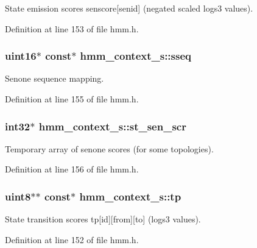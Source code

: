 State emission scores senscore[senid] (negated scaled logs3 values). 



Definition at line 153 of file hmm.\-h.

\subsubsection[{sseq}]{\setlength{\rightskip}{0pt plus 5cm}uint16$\ast$ const$\ast$ hmm\-\_\-context\-\_\-s\-::sseq}\label{structhmm__context__s_abbb0a32aadcc1938d9f21b04204c52da}


Senone sequence mapping. 



Definition at line 155 of file hmm.\-h.

\subsubsection[{st\-\_\-sen\-\_\-scr}]{\setlength{\rightskip}{0pt plus 5cm}int32$\ast$ hmm\-\_\-context\-\_\-s\-::st\-\_\-sen\-\_\-scr}\label{structhmm__context__s_a671c02e0443f41914471a7acfac6125c}


Temporary array of senone scores (for some topologies). 



Definition at line 156 of file hmm.\-h.

\subsubsection[{tp}]{\setlength{\rightskip}{0pt plus 5cm}uint8$\ast$$\ast$ const$\ast$ hmm\-\_\-context\-\_\-s\-::tp}\label{structhmm__context__s_a9ef2d83f67525050bea8b05f8a118f44}


State transition scores tp[id][from][to] (logs3 values). 



Definition at line 152 of file hmm.\-h.

